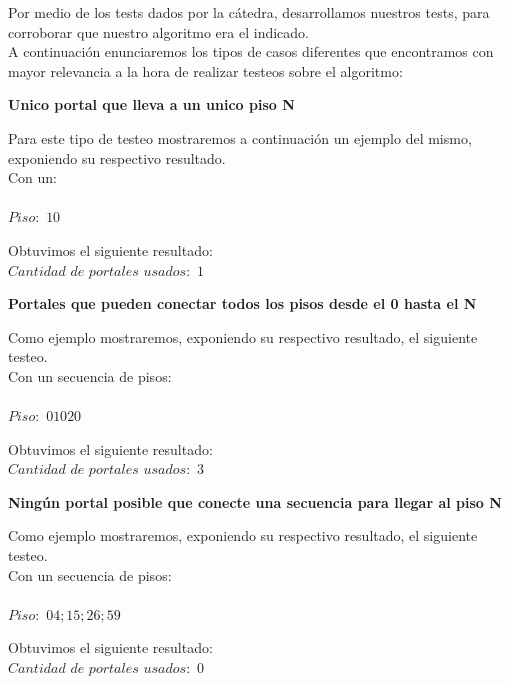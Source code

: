 \indent Por medio de los tests dados por la c\'atedra, desarrollamos nuestros tests,
para corroborar que nuestro algoritmo era el indicado.\\

A continuaci\'on enunciaremos los tipos de casos diferentes que encontramos con mayor relevancia a la hora de realizar
testeos sobre el algoritmo:\\

\begin{center}
 \textbf{Unico portal que lleva a un unico piso N}
\end{center}
 Para este tipo de testeo mostraremos a continuaci\'on un ejemplo del mismo, exponiendo su respectivo resultado.\\

 Con un:\\\\
  \indent  $Piso:$ $10$
  
  Obtuvimos el siguiente resultado:\\
  
  $Cantidad$ $de$ $portales$ $usados:$ $1$


 \begin{center}
 \textbf{Portales que pueden conectar todos los pisos desde el 0 hasta el N}
\end{center}
 Como ejemplo mostraremos, exponiendo su respectivo resultado, el siguiente testeo.\\

 Con un secuencia de pisos:\\\\
  \indent  $Piso:$ $0 10 20 $
  
  Obtuvimos el siguiente resultado:\\
  
  $Cantidad$ $de$ $portales$ $usados:$ $3$
  
  
 
 \begin{center}
 \textbf{Ning\'un portal posible que conecte una secuencia para llegar al piso N}
\end{center}
 Como ejemplo mostraremos, exponiendo su respectivo resultado, el siguiente testeo.\\

 Con un secuencia de pisos:\\\\
  \indent  $Piso:$ $0 4; 1 5; 2 6; 5 9$
  
  Obtuvimos el siguiente resultado:\\
  
  $Cantidad$ $de$ $portales$ $usados:$ $0$